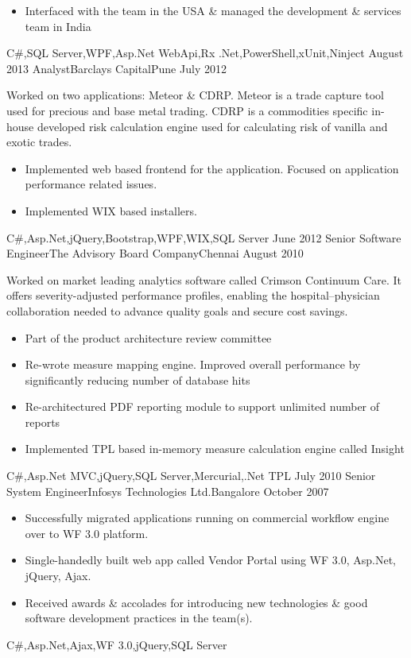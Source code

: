 \begin{experiences}
{\begin{itemize}
                        \item Interfaced with the team in the USA \& managed the development \& services team in India
                      \end{itemize}
                    }
                    {C\#,SQL Server,WPF,Asp.Net WebApi,Rx .Net,PowerShell,xUnit,Ninject}
  \emptySeparator
  \experience
  {August 2013}     {Analyst}{Barclays Capital}{Pune}
  {July 2012}   	{
  					  Worked on two applications: Meteor \& CDRP. Meteor is a trade capture tool used for precious and base metal trading. CDRP is a commodities specific in-house
  					  developed risk calculation engine used for calculating risk of vanilla and exotic trades.
                      \begin{itemize}
                        \item Implemented web based frontend for the application. Focused on application performance related issues.
                        \item Implemented WIX based installers.
                      \end{itemize}
                    }
                    {C\#,Asp.Net,jQuery,Bootstrap,WPF,WIX,SQL Server}
  \emptySeparator         
  \experience
  {June 2012}  {Senior Software Engineer}{The Advisory Board Company}{Chennai}
  {August 2010}   {
                      Worked on market leading analytics software called Crimson Continuum Care. It offers severity-adjusted performance profiles, enabling the hospital–physician collaboration needed to advance quality goals and secure cost savings.  
                      \begin{itemize}
                        \item Part of the product architecture review committee
                        \item Re-wrote measure mapping engine. Improved overall performance by significantly reducing number of database hits
                        \item Re-architectured PDF reporting module to support unlimited number of reports
                        \item Implemented TPL based in-memory measure calculation engine called Insight  
                      \end{itemize}
                  }
                  {C\#,Asp.Net MVC,jQuery,SQL Server,Mercurial,.Net TPL} 
  \emptySeparator         
  \experience
  {July 2010}  {Senior System Engineer}{Infosys Technologies Ltd.}{Bangalore}
  {October 2007}   {
				  	\begin{itemize}                                         
				  		\item Successfully migrated applications running on commercial workflow engine over to WF 3.0 platform.
				  		\item Single-handedly built web app called Vendor Portal using WF 3.0, Asp.Net, jQuery, Ajax.
				  		\item Received awards \& accolades for introducing new technologies \& good software development practices in the team(s).
				  	\end{itemize}
				  }
  				  {C\#,Asp.Net,Ajax,WF 3.0,jQuery,SQL Server}
\end{experiences}
